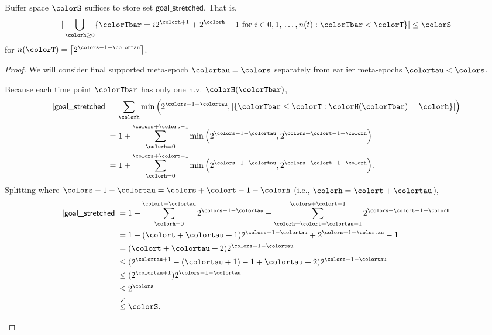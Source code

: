 \begin{lemma}
\label{thm:stretched-first-n-space}

Buffer space $\colorS$ suffices to store set $\textsf{goal\_stretched}$.
That is,
\begin{align*}
|\bigcup_{\colorh \geq 0}
\{ \colorTbar = i2^{\colorh + 1} + 2^{\colorh} - 1 \text{ for } i \in 0,1,\,\ldots,n(t) : \colorTbar < \colorT \}| \leq \colorS
\end{align*}
for $n(\colorT) = \left\lceil 2^{\colors - 1 - \colortau} \right\rceil$.
\end{lemma}
\begin{proof}
We will consider final supported meta-epoch $\colortau=\colors$ separately from earlier meta-epochs $\colortau<\colors$.

\begin{proofpart}
Because each time point $\colorTbar$ has only one h.v. $\colorH(\colorTbar)$,
\begin{align*}
|\textsf{goal\_stretched}|
&=
\sum_{\colorh} \min\Big(2^{\colors - 1 - \colortau}, |\{ \colorTbar \leq \colorT : \colorH(\colorTbar) = \colorh \}|\Big)\\
&=
1 + \sum_{\colorh=0}^{\colors + \colort - 1} \min\Big(2^{\colors - 1 - \colortau}, 2^{\colors + \colort - 1 - \colorh}\Big)\\
&=
1 + \sum_{\colorh=0}^{\colors + \colort - 1} \min\Big(2^{\colors - 1 - \colortau}, 2^{\colors + \colort - 1 - \colorh}\Big).
\end{align*}
Splitting where $\colors - 1 - \colortau = \colors + \colort - 1 - \colorh$ (i.e., $\colorh = \colort + \colortau$),
\begin{align*}
|\textsf{goal\_stretched}|
&=
1 + \sum_{\colorh=0}^{\colort + \colortau} 2^{\colors - 1 - \colortau} + \sum_{\colorh=\colort + \colortau + 1}^{\colors + \colort - 1} 2^{\colors + \colort - 1 - \colorh}\\
&=
1 + (\colort + \colortau + 1) 2^{\colors - 1 - \colortau} + 2^{\colors - 1 - \colortau} - 1\\
&=
(\colort + \colortau + 2) 2^{\colors - 1 - \colortau}\\
&\leq
(2^{\colortau + 1} - (\colortau + 1) - 1 + \colortau + 2) 2^{\colors - 1 - \colortau}\\
&\leq
(2^{\colortau + 1}) 2^{\colors - 1 - \colortau}\\
&\leq
2^{\colors}\\
&\stackrel{\checkmark}\leq
\colorS.
\end{align*}
\end{proofpart}


\end{proof}
